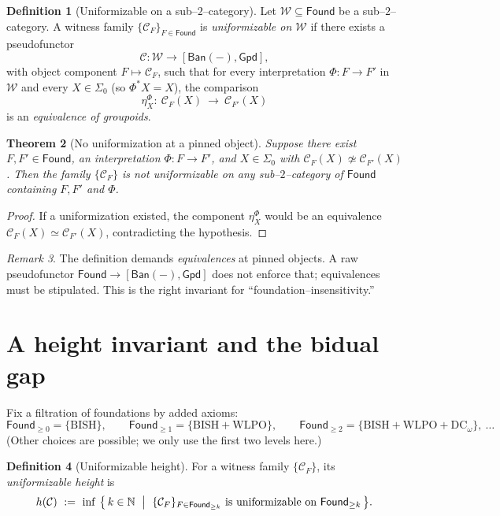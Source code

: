 \documentclass[11pt]{article}
\newtheorem{theorem}{Theorem}[section]
\theoremstyle{definition}
\newtheorem{definition}[theorem]{Definition}
\theoremstyle{remark}
\newtheorem{remark}[theorem]{Remark}
\newcommand{\N}{\mathbb{N}}
\newcommand{\WLPO}{\mathrm{WLPO}}
\newcommand{\BISH}{\mathrm{BISH}}
\newcommand{\Found}{\mathsf{Found}}
\newcommand{\Ban}{\mathsf{Ban}}
\newcommand{\Gpd}{\mathsf{Gpd}}
\newcommand{\SigmaZero}{\Sigma_{0}}
\begin{document}
\begin{definition}[Uniformizable on a sub--$2$--category]
Let \(\mathcal W\subseteq\Found\) be a sub--$2$--category. A witness family \(\{\mathcal C_F\}_{F\in\Found}\) is \emph{uniformizable on \(\mathcal W\)} if there exists a pseudofunctor
\[
  \mathcal C:\mathcal W \longrightarrow [\Ban(-),\Gpd],
\]
with object component \(F\mapsto \mathcal C_F\), such that for every interpretation \(\Phi:F\to F'\) in \(\mathcal W\) and every \(X\in\SigmaZero\) (so \(\Phi^*X=X\)), the comparison
\[
  \eta^\Phi_X:\ \mathcal C_F(X)\ \longrightarrow\ \mathcal C_{F'}(X)
\]
is an \emph{equivalence of groupoids}.
\end{definition}

\begin{theorem}[No uniformization at a pinned object]\label{thm:no-unif}
Suppose there exist \(F,F'\in\Found\), an interpretation \(\Phi:F\to F'\), and \(X\in\SigmaZero\) with
\(\mathcal C_F(X)\not\simeq\mathcal C_{F'}(X)\).
Then the family \(\{\mathcal C_F\}\) is not uniformizable on any sub--$2$--category of \(\Found\) containing \(F,F'\) and \(\Phi\).
\end{theorem}

\begin{proof}
If a uniformization existed, the component \(\eta^\Phi_X\) would be an equivalence
\(\mathcal C_F(X)\simeq\mathcal C_{F'}(X)\), contradicting the hypothesis.
\end{proof}

\begin{remark}
The definition demands \emph{equivalences} at pinned objects. A raw pseudofunctor \(\Found\to[\Ban(-),\Gpd]\) does not enforce that; equivalences must be stipulated. This is the right invariant for “foundation--insensitivity.”
\end{remark}

\section{A height invariant and the bidual gap}\label{sec:height}

Fix a filtration of foundations by added axioms:
\[
\Found_{\ge 0}=\{\BISH\},\qquad
\Found_{\ge 1}=\{\BISH+\WLPO\},\qquad
\Found_{\ge 2}=\{\BISH+\WLPO+\mathrm{DC}_\omega\},\ \ldots
\]
(Other choices are possible; we only use the first two levels here.)

\begin{definition}[Uniformizable height]
For a witness family \(\{\mathcal C_F\}\), its \emph{uniformizable height} is
\[
  h(\mathcal C)\ :=\ \inf\ \bigl\{\,k\in\N\ \bigm|\ 
    \{\mathcal C_F\}_{F\in \Found_{\ge k}} \text{ is uniformizable on }\Found_{\ge k}\,\bigr\}.
\]
\end{definition}
\end{document}
